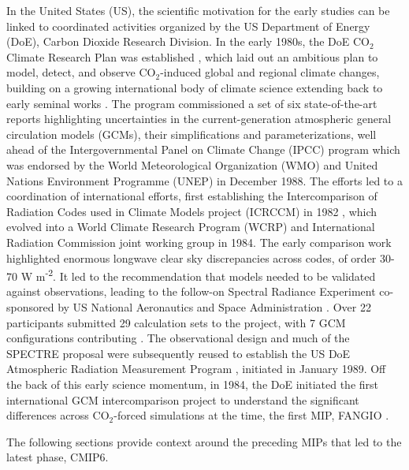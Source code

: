 \documentclass[gmd, preprint]{copernicus}
\begin{document}
In the United States (US), the scientific motivation for the early studies can be linked to coordinated activities organized by the US Department of Energy (DoE), Carbon Dioxide Research Division. In the early 1980s, the DoE CO$_{2}$ Climate Research Plan was established \citep{riches_co2_1983}, which laid out an ambitious plan to model, detect, and observe CO$_{2}$-induced global and regional climate changes, building on a growing international body of climate science extending back to early seminal works \citep[e.g.,][]{arrhenius_xxxi_1896,chamberlin_attempt_1899,charney_carbon_1979}. The program commissioned a set of six state-of-the-art reports \citep[e.g.,][]{maccracken_projecting_1985} highlighting uncertainties in the current-generation atmospheric general circulation models (GCMs), their simplifications and parameterizations, well ahead of the Intergovernmental Panel on Climate Change (IPCC) program which was endorsed by the World Meteorological Organization (WMO) and United Nations Environment Programme (UNEP) in December 1988. The efforts led to a coordination of international efforts, first establishing the Intercomparison of Radiation Codes used in Climate Models project (ICRCCM) in 1982 \citep{luther_intercomparison_1988,ellingson_intercomparison_1991}, which evolved into a World Climate Research Program (WCRP) and International Radiation Commission joint working group in 1984. The early comparison work highlighted enormous longwave clear sky discrepancies across codes, of order 30-70 W m\textsuperscript{-2}. It led to the recommendation that models needed to be validated against observations, leading to the follow-on Spectral Radiance Experiment \citep[SPECTRE;][]{ellingson_icrccm_1990} co-sponsored by US National Aeronautics and Space Administration \citep[NASA;][]{ellingson_spectral_1996}. Over 22 participants submitted 29 calculation sets to the project, with 7 GCM configurations contributing \citep{ellingson_atmospheric_2016}. The observational design and much of the SPECTRE proposal were subsequently reused to establish the US DoE Atmospheric Radiation Measurement Program \citep[ARM;][]{us_department_of_energy_atmospheric_1990}, initiated in January 1989. Off the back of this early science momentum, in 1984, the DoE initiated the first international GCM intercomparison project to understand the significant differences across CO$_{2}$-forced simulations at the time, the first MIP, FANGIO \citep[see \autoref{sec:amip1And2};][]{ellingson_atmospheric_2016}.

The following sections provide context around the preceding MIPs that led to the latest phase, CMIP6.
\end{document}
